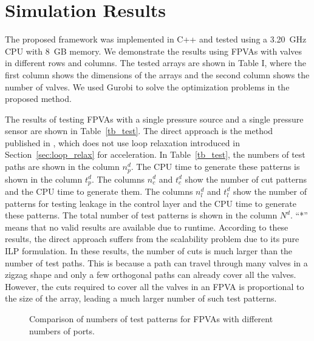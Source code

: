 \section{Simulation Results}\label{sec:results}

The proposed framework was implemented in C++ and tested
using a \SI[mode=text]{3.20}{\GHz} CPU with 
\SI{8}{GB} memory.
We demonstrate
the results using FPVAs with valves in different rows and columns. The
tested arrays are shown in Table I, where the first column shows
the dimensions of the arrays and the second column shows
the number of valves. 
We used Gurobi \cite{gurobi} to solve the optimization problems in the
proposed method.

The results of testing FPVAs with a single pressure source and a single pressure sensor
are shown in Table~\ref{tb_test}.
The direct approach is the method published in \cite{CBBK17}, which
does not use loop relaxation introduced in Section~\ref{sec:loop_relax} for
acceleration. In Table~\ref{tb_test}, the
numbers of test paths are shown in the column $n^d_p$. The CPU time to
generate these patterns is shown in the column $t^d_p$. The columns $n^d_c$ and
$t^d_c$ show the number of cut patterns and the CPU time to generate them.
The columns $n^d_l$ and $t_l^d$ show the number of patterns for testing leakage in the
control layer and the CPU time to generate these patterns. The
total number of test patterns is shown in the column $N^d$. 
``*'' means that no valid results are available 
due to runtime.
According to these results, the direct approach suffers from the scalability problem
due to its pure ILP formulation.
In these results, the number of cuts is much larger than the number of test
paths. This is because a path can travel through many valves in a zigzag shape and 
only a few orthogonal paths can already cover all the valves.
However, the cuts required to cover all the valves in an
FPVA is proportional to the size of the array, leading a much larger number of
such test patterns.

\begin{figure}[t]
{\figurefontsize
\centering

%
\caption{Comparison of numbers of test patterns for FPVAs with different
numbers of ports.}
\label{fig:port_test}
}
\end{figure}

